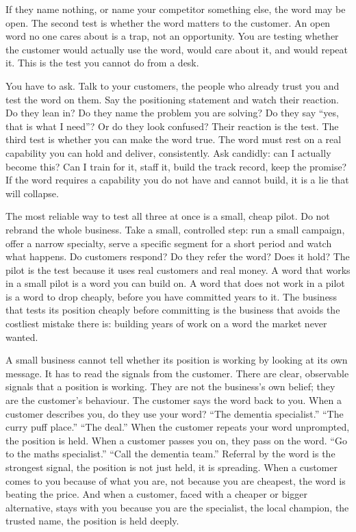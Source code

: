 \documentclass[10pt,twoside,openany]{memoir}
\begin{document}
{If they name nothing, or name your competitor something else, the word
may be open. The second test is whether the word matters to the
customer. An open word no one cares about is a trap, not an opportunity.
You are testing whether the customer would actually use the word, would
care about it, and would repeat it. This is the test you cannot do from
a desk.

You have to ask. Talk to your customers, the people who already trust
you and test the word on them. Say the positioning statement and watch
their reaction. Do they lean in? Do they name the problem you are
solving? Do they say ``yes, that is what I need''? Or do they look
confused? Their reaction is the test. The third test is whether you can
make the word true. The word must rest on a real capability you can hold
and deliver, consistently. Ask candidly: can I actually become this? Can
I train for it, staff it, build the track record, keep the promise? If
the word requires a capability you do not have and cannot build, it is a
lie that will collapse.

The most reliable way to test all three at once is a small, cheap pilot.
Do not rebrand the whole business. Take a small, controlled step: run a
small campaign, offer a narrow specialty, serve a specific segment for a
short period and watch what happens. Do customers respond? Do they refer
the word? Does it hold? The pilot is the test because it uses real
customers and real money. A word that works in a small pilot is a word
you can build on. A word that does not work in a pilot is a word to drop
cheaply, before you have committed years to it. The business that tests
its position cheaply before committing is the business that avoids the
costliest mistake there is: building years of work on a word the market
never wanted.

A small business cannot tell whether its position is working by looking
at its own message. It has to read the signals from the customer. There
are clear, observable signals that a position is working. They are not
the business's own belief; they are the customer's behaviour. The
customer says the word back to you. When a customer describes you, do
they use your word? ``The dementia specialist.'' ``The curry puff
place.'' ``The deal.'' When the customer repeats your word unprompted,
the position is held. When a customer passes you on, they pass on the
word. ``Go to the maths specialist.'' ``Call the dementia team.''
Referral by the word is the strongest signal, the position is not just
held, it is spreading. When a customer comes to you because of what you
are, not because you are cheapest, the word is beating the price. And
when a customer, faced with a cheaper or bigger alternative, stays with
you because you are the specialist, the local champion, the trusted
name, the position is held deeply.

}
\end{document}
